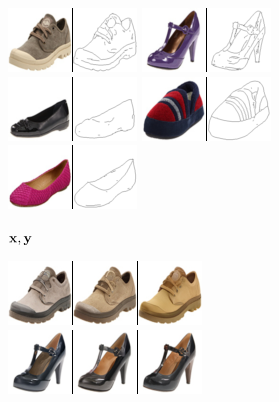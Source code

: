   \begin{figure}[t]
    \centering
    \begin{subfigure}[t]{0.2\textwidth}
      \centering
      \includegraphics[height=\edgesstuffimgheight]{figs/cigcvae/image-samples/shoes/image_aipo_0_imagenet_gt_masked.png}
      \includegraphics[height=\edgesstuffimgheight]{figs/cigcvae/image-samples/shoes/image_aipo_1_imagenet_gt_masked.png}
      \includegraphics[height=\edgesstuffimgheight]{figs/cigcvae/image-samples/shoes/image_aipo_2_imagenet_gt_masked.png}
      \includegraphics[height=\edgesstuffimgheight]{figs/cigcvae/image-samples/shoes/image_aipo_3_imagenet_gt_masked.png}
      \includegraphics[height=\edgesstuffimgheight]{figs/cigcvae/image-samples/shoes/image_aipo_4_imagenet_gt_masked.png}
      \caption{$\mathbf{x}, \mathbf{y}$}
    \end{subfigure}
    \begin{subfigure}[t]{0.25\textwidth}
      \centering
      \includegraphics[height=\edgesstuffimgheight]{figs/cigcvae/image-samples/shoes/image_aipo_0_t=0.85_imagenet_samples.png}
      \includegraphics[height=\edgesstuffimgheight]{figs/cigcvae/image-samples/shoes/image_aipo_1_t=0.85_imagenet_samples.png}

\end{subfigure}
\end{figure}
